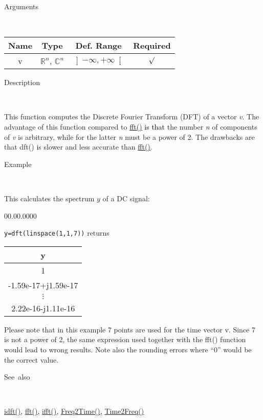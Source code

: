 \begin{description}
\item [Arguments]~
\end{description}
\begin{tabular}{|c|c|c|c|}
\hline 
Name&
Type&
Def. Range&
Required\tabularnewline
\hline
\hline 
v&
$\mathbb{R}^{n}$, $\mathbb{C}^{n}$&
$\left]-\infty,+\infty\right[$&
$\surd$\tabularnewline
\hline 
\end{tabular}

\begin{description}
\item [Description]~
\end{description}

This function computes the Discrete Fourier Transform (DFT) of a
vector \textit{v}. The advantage of this function compared to
\textcolor{blue}{\hyperlink{fft}{fft()}} \textcolor{black}{is that}
the number \textit{n} of components of
\textit{v} is arbitrary, while for the latter \textit{n} must be a
power of 2. The drawbacks are that dft() is slower and less accurate
than \textcolor{blue}{\hyperlink{fft}{fft()}}.

\begin{description}
\item [Example]~
\end{description}
This calculates the spectrum $y$ of a DC signal:

\begin{lyxlist}{00.00.0000}
\item [\texttt{y=dft(linspace(1,1,7))}]returns \begin{tabular}{|c|}
\hline 
y\tabularnewline
\hline
\hline 
1\tabularnewline
\hline 
-1.59e-17+j1.59e-17\tabularnewline
\hline 
$\vdots$\tabularnewline
\hline 
2.22e-16-j1.11e-16\tabularnewline
\hline
\end{tabular}
\end{lyxlist}
Please note that in this example 7 points are used for the time vector
v. Since 7 is not a power of 2, the same expression used together with
the fft() function would lead to wrong results. Note also the rounding
errors where {}``0'' would be the correct value.

\begin{description}
\item [See~also]~
\end{description}
\textcolor{blue}{\hyperlink{idft}{idft()}}\textcolor{black}{,} \textcolor{blue}{\hyperlink{fft}{fft()}}\textcolor{black}{,}
\textcolor{blue}{\hyperlink{ifft}{ifft()}}\textcolor{black}{,}
\textcolor{blue}{\hyperlink{Freq2Time}{Freq2Time()}}\textcolor{black}{,}
\textcolor{blue}{\hyperlink{Time2Freq}{Time2Freq()}}



